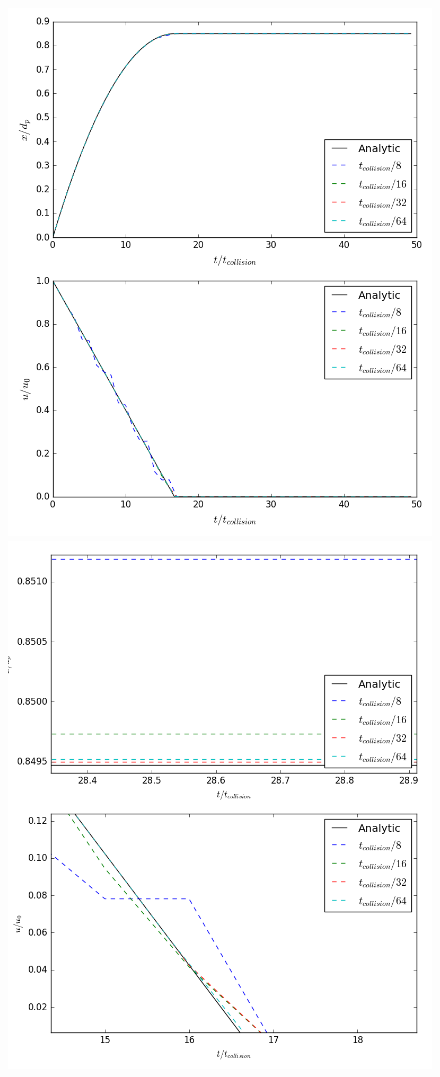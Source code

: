 \documentclass[a4paper,11pt,titlepage]{report}
\begin{document}
\begin{figure}[!htb]
\centering
\includegraphics[scale=0.45]{figures/opencl_verification/friction_verification.png}
\includegraphics[scale=0.45]{figures/opencl_verification/friction_verification_zoomed.png}

\end{figure}
\end{document}
